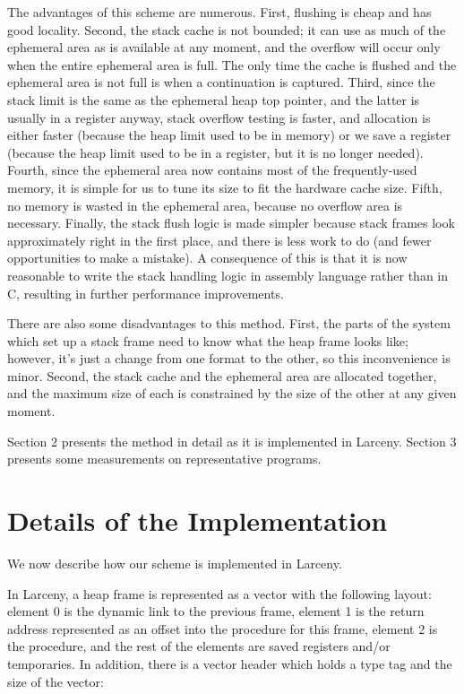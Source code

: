 The advantages of this scheme are numerous. First, flushing is cheap and has
good locality.  Second, the stack cache is not bounded; it can use as much
of the ephemeral area as is available at any moment, and the overflow will
occur only when the entire ephemeral area is full. The only time the cache
is flushed and the ephemeral area is not full is when a continuation is
captured. Third, since the stack limit is the same as the ephemeral heap top
pointer, and the latter is usually in a register anyway, stack overflow
testing is faster, and allocation is either faster (because the heap limit
used to be in memory) or we save a register (because the heap limit used to
be in a register, but it is no longer needed). Fourth, since the ephemeral
area now contains most of the frequently-used memory, it is simple for us to
tune its size to fit the hardware cache size.  Fifth, no memory is wasted in
the ephemeral area, because no overflow area is necessary.  Finally, the
stack flush logic is made simpler because stack frames look approximately
right in the first place, and there is less work to do (and fewer
opportunities to make a mistake). A consequence of this is that it is now
reasonable to write the stack handling logic in assembly language rather
than in C, resulting in further performance improvements.

There are also some disadvantages to this method. First, the parts of the
system which set up a stack frame need to know what the heap frame looks
like; however, it's just a change from one format to the other, so this
inconvenience is minor. Second, the stack cache and the ephemeral area are
allocated together, and the maximum size of each is constrained by the size
of the other at any given moment.

Section 2 presents the method in detail as it is implemented in Larceny.
Section 3 presents some measurements on representative programs. 

\section{Details of the Implementation}

We now describe how our scheme is implemented in Larceny.


In Larceny, a heap frame is represented as a vector with the following
layout: element 0 is the dynamic link to the previous frame, element 1 is
the return address represented as an offset into the procedure for this
frame, element 2 is the procedure, and the rest of the elements are saved
registers and/or temporaries. In addition, there is a vector header
which holds a type tag and the size of the vector:

